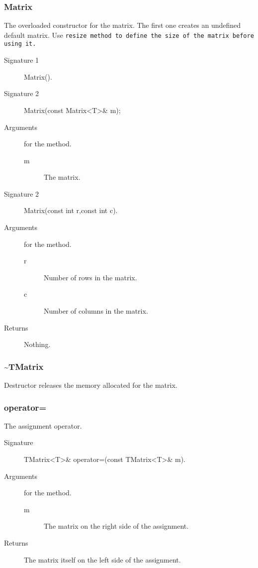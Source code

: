 \subsubsection{Matrix}
The overloaded  constructor for the  matrix. The first one  creates an
undefined default  matrix.  Use  \tt resize \rm  method to  define the
size of the matrix before using it.
\begin{description}
  \item[Signature 1] Matrix().
  \item[Signature 2] Matrix(const Matrix<T>\& m);
  \item[Arguments] for the method.
     \begin{description}
        \item[m] The matrix.
     \end{description}  
  \item[Signature 2] Matrix(const int r,const int c).
  \item[Arguments] for the method.
     \begin{description}
        \item[r] Number of rows in the matrix.
        \item[c] Number of columns in the matrix.
     \end{description}
  \item[Returns] Nothing.
\end{description}


\subsubsection{\~{ }TMatrix}
Destructor releases the memory allocated for the matrix.

\subsubsection{operator=}
The assignment operator.
\begin{description}
   \item[Signature] TMatrix<T>\& operator=(const TMatrix<T>\& m).
   \item[Arguments] for the method.
      \begin{description}
          \item[m] The matrix on the right side of the assignment.
      \end{description}
   \item[Returns] The matrix itself on the left side of the assignment.
\end{description}

